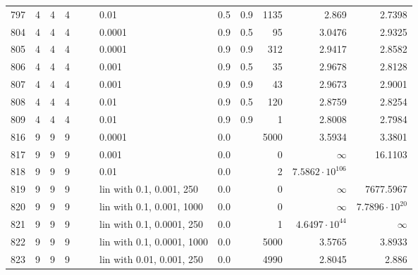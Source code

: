 \begin{longtable}{lrrrrrlrrrrr}
 797 &       4 & 4 & 4 &   &   &                        0.01 &  0.5 &    0.9 &    1135 &                  2.869 &                 2.7398 \\
 804 &       4 & 4 & 4 &   &   &                      0.0001 &  0.9 &    0.5 &      95 &                 3.0476 &                 2.9325 \\
 805 &       4 & 4 & 4 &   &   &                      0.0001 &  0.9 &    0.9 &     312 &                 2.9417 &                 2.8582 \\
 806 &       4 & 4 & 4 &   &   &                       0.001 &  0.9 &    0.5 &      35 &                 2.9678 &                 2.8128 \\
 807 &       4 & 4 & 4 &   &   &                       0.001 &  0.9 &    0.9 &      43 &                 2.9673 &                 2.9001 \\
 808 &       4 & 4 & 4 &   &   &                        0.01 &  0.9 &    0.5 &     120 &                 2.8759 &                 2.8254 \\
 809 &       4 & 4 & 4 &   &   &                        0.01 &  0.9 &    0.9 &       1 &                 2.8008 &                 2.7984 \\
 816 &       9 & 9 & 9 &   &   &                      0.0001 &  0.0 &        &    5000 &                 3.5934 &                 3.3801 \\
 817 &       9 & 9 & 9 &   &   &                       0.001 &  0.0 &        &       0 &               $\infty$ &                16.1103 \\
 818 &       9 & 9 & 9 &   &   &                        0.01 &  0.0 &        &       2 & $7.5862\cdot 10^{106}$ &                        \\
 819 &       9 & 9 & 9 &   &   &    lin with 0.1, 0.001, 250 &  0.0 &        &       0 &               $\infty$ &              7677.5967 \\
 820 &       9 & 9 & 9 &   &   &   lin with 0.1, 0.001, 1000 &  0.0 &        &       0 &               $\infty$ &  $7.7896\cdot 10^{20}$ \\
 821 &       9 & 9 & 9 &   &   &   lin with 0.1, 0.0001, 250 &  0.0 &        &       1 &  $4.6497\cdot 10^{44}$ &               $\infty$ \\
 822 &       9 & 9 & 9 &   &   &  lin with 0.1, 0.0001, 1000 &  0.0 &        &    5000 &                 3.5765 &                 3.8933 \\
 823 &       9 & 9 & 9 &   &   &   lin with 0.01, 0.001, 250 &  0.0 &        &    4990 &                 2.8045 &                  2.886 \\

\end{longtable}
